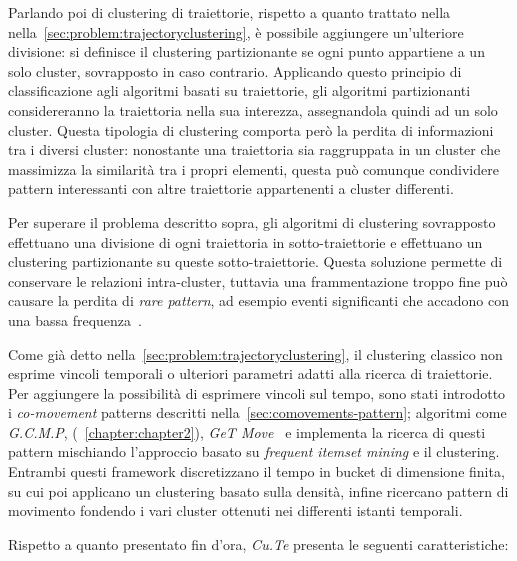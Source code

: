 Parlando poi di clustering di traiettorie, rispetto a quanto trattato nella nella~\cref{sec:problem:trajectoryclustering}, è possibile aggiungere un'ulteriore divisione:
si definisce il clustering partizionante se ogni punto appartiene a un solo cluster, sovrapposto in caso contrario.
Applicando questo principio di classificazione agli algoritmi basati su traiettorie, gli algoritmi partizionanti considereranno la traiettoria nella sua interezza,
assegnandola quindi ad un solo cluster. Questa tipologia di clustering comporta però la perdita di informazioni tra i diversi cluster:
nonostante una traiettoria sia raggruppata in un cluster che massimizza la similarità tra i propri elementi,
questa può comunque condividere pattern interessanti con altre traiettorie appartenenti a cluster differenti.

Per superare il problema descritto sopra, gli algoritmi di clustering sovrapposto effettuano una divisione di ogni traiettoria
in sotto-traiettorie e effettuano un clustering partizionante su queste sotto-traiettorie.
Questa soluzione permette di conservare le relazioni intra-cluster, tuttavia una frammentazione troppo fine può causare
la perdita di \textit{rare pattern}, ad esempio eventi significanti che accadono con una bassa frequenza~\cite{DBLP:journals/tkdd/KohR16, DBLP:journals/geoinformatica/HuangPX06}.

Come già detto nella~\cref{sec:problem:trajectoryclustering}, il clustering classico non esprime vincoli temporali o ulteriori parametri adatti alla ricerca di traiettorie.
Per aggiungere la possibilità di esprimere vincoli sul tempo, sono stati introdotto i \textit{co-movement} patterns descritti nella~\cref{sec:comovements-pattern}; algoritmi come \textit{G.C.M.P},
(~\cref{chapter:chapter2}), \textit{GeT Move}~\cite{DBLP:journals/ijitdm/PhanPT16} e  implementa la ricerca di questi pattern mischiando l'approccio basato su \textit{frequent itemset mining} e il clustering.
Entrambi questi framework discretizzano il tempo in bucket di dimensione finita, su cui poi applicano un clustering basato sulla densità, infine
ricercano pattern di movimento fondendo i vari cluster ottenuti nei differenti istanti temporali.

Rispetto a quanto presentato fin d'ora, \textit{Cu.Te} presenta le seguenti caratteristiche:

